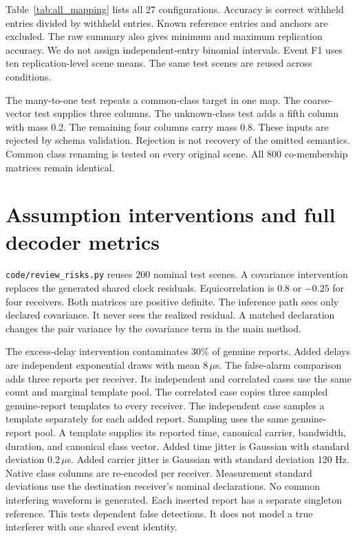 \documentclass[10pt,a4paper]{article}
\begin{document}
Table~\ref{tab:all_mapping} lists all 27 configurations. Accuracy is correct withheld entries divided by withheld entries. Known reference entries and anchors are excluded. The raw summary also gives minimum and maximum replication accuracy. We do not assign independent-entry binomial intervals. Event F1 uses ten replication-level scene means. The same test scenes are reused across conditions.

\begin{table}[!htb]\caption{All independent adaptation conditions for alternating estimation. Anchors are per unknown receiver. Correct/hidden counts sum over ten map seeds. Sequential event-pair F1 is identical in every condition. Exact denotes visible-event recovery.}\label{tab:all_mapping}
\scriptsize\setlength{\tabcolsep}{3pt}\end{table}

The many-to-one test repeats a common-class target in one map. The coarse-vector test supplies three columns. The unknown-class test adds a fifth column with mass 0.2. The remaining four columns carry mass 0.8. These inputs are rejected by schema validation. Rejection is not recovery of the omitted semantics. Common class renaming is tested on every original scene. All 800 co-membership matrices remain identical.
\FloatBarrier

\section{Assumption interventions and full decoder metrics}
\texttt{code/review\_risks.py} reuses 200 nominal test scenes. A covariance intervention replaces the generated shared clock residuals. Equicorrelation is 0.8 or $-0.25$ for four receivers. Both matrices are positive definite. The inference path sees only declared covariance. It never sees the realized residual. A matched declaration changes the pair variance by the covariance term in the main method.

The excess-delay intervention contaminates 30\% of genuine reports. Added delays are independent exponential draws with mean $8\,\mu$s. The false-alarm comparison adds three reports per receiver. Its independent and correlated cases use the same count and marginal template pool. The correlated case copies three sampled genuine-report templates to every receiver. The independent case samples a template separately for each added report. Sampling uses the same genuine-report pool. A template supplies its reported time, canonical carrier, bandwidth, duration, and canonical class vector. Added time jitter is Gaussian with standard deviation $0.2\,\mu$s. Added carrier jitter is Gaussian with standard deviation 120 Hz. Native class columns are re-encoded per receiver. Measurement standard deviations use the destination receiver's nominal declarations. No common interfering waveform is generated. Each inserted report has a separate singleton reference. This tests dependent false detections. It does not model a true interferer with one shared event identity.
\end{document}
